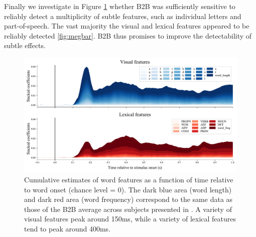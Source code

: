 Finally we investigate in Figure \ref{fig:megresult} whether B2B was sufficiently sensitive to reliably detect a multiplicity of subtle features, such as individual letters and part-of-speech. The vast majority the visual and lexical features appeared to be reliably detected \ref{fig:megbar}. B2B thus promises to improve the detectability of subtle effects.

\begin{figure}
  \centering
  \includegraphics[width=\textwidth, trim=0cm 0cm 0cm 0cm, clip=True]{figures/meg_result.pdf}
  \caption{Cumulative estimates of word features as a function of time relative to word onset (chance level = 0). The dark blue area (word length) and dark red area (word frequency) correspond to the same data as those of the B2B average across subjects presented in \label{fig:meg_twocurves}. A variety of visual features peak around 150ms, while a variety of lexical features tend to peak around 400ms.}
  \label{fig:megresult}
\end{figure}
